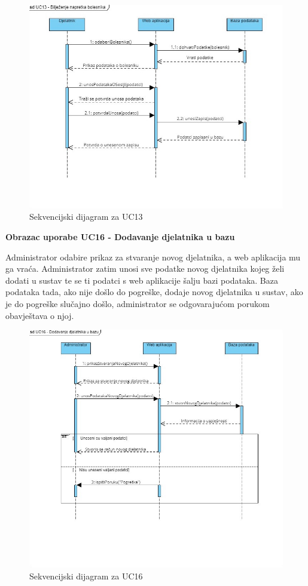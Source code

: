 \begin{figure}[h!]
    \centering
    \includegraphics[width=\textwidth]{./slike/Sekvencijski - UC13.jpg} 
    \caption{Sekvencijski dijagram za UC13}
    \label{fig:my_image}
\end{figure}
\eject

\textbf{Obrazac uporabe UC16 - Dodavanje djelatnika u bazu}

Administrator odabire prikaz za stvaranje novog djelatnika, a web aplikacija mu ga vraća. Administrator zatim unosi sve podatke novog djelatnika kojeg želi dodati u sustav te se ti podatci s web aplikacije šalju bazi podataka. Baza podataka tada, ako nije došlo do pogreške, dodaje novog djelatnika u sustav, ako je do pogreške slučajno došlo, administrator se odgovarajućom porukom obavještava o njoj.

\begin{figure}[h!]
    \centering
    \includegraphics[width=\textwidth]{./slike/Sekvencijski - UC16.jpg} 
    \caption{Sekvencijski dijagram za UC16}
    \label{fig:my_image}
\end{figure}
\eject

